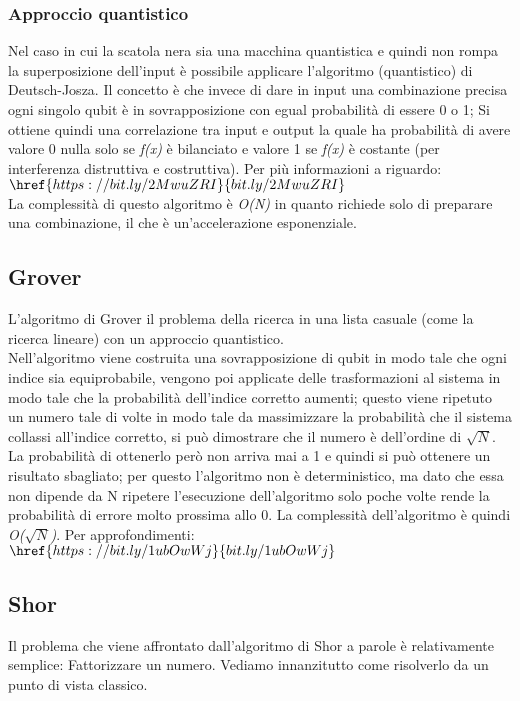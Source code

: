 \subsubsection{Approccio quantistico}
Nel caso in cui la scatola nera sia una macchina quantistica e quindi non rompa la superposizione dell'input è possibile applicare l'algoritmo (quantistico) di Deutsch-Josza. Il concetto è che invece di dare in input una combinazione precisa ogni singolo qubit è in sovrapposizione con egual probabilità di essere 0 o 1; Si ottiene quindi una correlazione tra input e output la quale ha probabilità di avere valore 0 nulla solo se \textit{f(x)} è bilanciato e valore 1 se \textit{f(x)} è costante (per interferenza distruttiva e costruttiva).
Per più informazioni a riguardo:\\
$\href{https://bit.ly/2MwuZRI}{bit.ly/2MwuZRI}$\\
La complessità di questo algoritmo è \textit{O(N)} in quanto richiede solo di preparare una combinazione, il che è un'accelerazione esponenziale.
\subsection{Grover}
L'algoritmo di Grover il problema della ricerca in una lista casuale (come la ricerca lineare) con un approccio quantistico.\\
Nell'algoritmo viene costruita una sovrapposizione di qubit in modo tale che ogni indice sia equiprobabile, vengono poi applicate delle trasformazioni al sistema in modo tale che la probabilità dell'indice corretto aumenti; questo viene ripetuto un numero tale di volte in modo tale da massimizzare la probabilità che il sistema collassi all'indice corretto, si può dimostrare che il numero è dell'ordine di $\sqrt{N}$.
La probabilità di ottenerlo però non arriva mai a 1 e quindi si può ottenere un risultato sbagliato; per questo l'algoritmo non è deterministico, ma dato che essa non dipende da N ripetere l'esecuzione dell'algoritmo solo poche volte rende la probabilità di errore molto prossima allo  0. La complessità dell'algoritmo è quindi \textit{O($\sqrt{N}$)}.
Per approfondimenti:\\
$\href{https://bit.ly/1ubOwWj}{bit.ly/1ubOwWj}$
\subsection{Shor}
Il problema che viene affrontato dall'algoritmo di Shor a parole è relativamente semplice: Fattorizzare un numero. Vediamo innanzitutto come risolverlo da un punto di vista classico.
